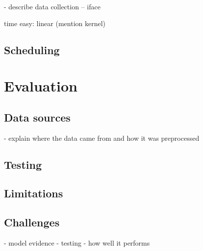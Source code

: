 \documentclass[a4paper,12pt,twoside,openright]{report}
\begin{document}
- describe data collection
-- iface


time easy: linear (mention kernel)




\section{Scheduling} 


\chapter{Evaluation} 

\section{Data sources}
- explain where the data came from and how it was preprocessed
\section{Testing}
\section{Limitations}
\section{Challenges} %
- model evidence
- testing
- how well it performs
\end{document}
